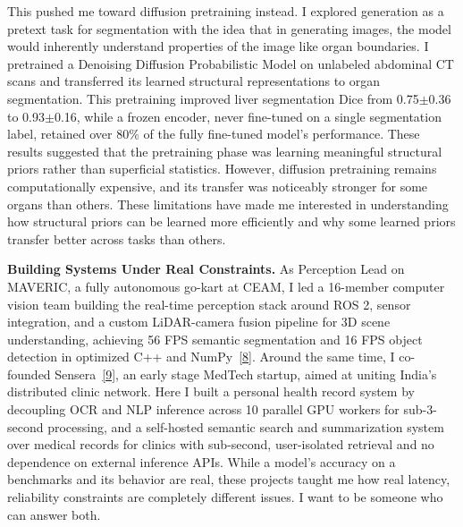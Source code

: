 \documentclass[12pt]{article}
\begin{document}
This pushed me toward diffusion pretraining instead. I explored generation as a pretext task for segmentation with the idea that in generating images, the model would inherently understand properties of the image like organ boundaries. I pretrained a Denoising Diffusion Probabilistic Model on unlabeled abdominal CT scans and transferred its learned structural representations to organ segmentation. This pretraining improved liver segmentation Dice from 0.75$\pm$0.36 to 0.93$\pm$0.16, while a frozen encoder, never fine-tuned on a single segmentation label, retained over 80\% of the fully fine-tuned model's performance. These results suggested that the pretraining phase was learning meaningful structural priors rather than superficial statistics. However, diffusion pretraining remains computationally expensive, and its transfer was noticeably stronger for some organs than others. These limitations have made me interested in understanding how structural priors can be learned more efficiently and why some learned priors transfer better across tasks than others.



\vspace{8pt}

\textbf{Building Systems Under Real Constraints.} As Perception Lead on MAVERIC, a fully autonomous go-kart at CEAM, I led a 16-member computer vision team building the real-time perception stack around ROS 2, sensor integration, and a custom LiDAR-camera fusion pipeline for 3D scene understanding, achieving 56 FPS semantic segmentation and 16 FPS object detection in optimized C++ and NumPy~\hyperref[ref8]{[8]}. Around the same time, I co-founded Sensera~\hyperref[ref9]{[9]}, an early stage MedTech startup, aimed at uniting India's distributed clinic network. Here I built a personal health record system by decoupling OCR and NLP inference across 10 parallel GPU workers for sub-3-second processing, and a self-hosted semantic search and summarization system over medical records for clinics with sub-second, user-isolated retrieval and no dependence on external inference APIs. While a model's accuracy on a benchmarks and its behavior are real, these projects taught me how real latency, reliability constraints are completely different issues. I want to be someone who can answer both.

\vspace{8pt}
\end{document}
